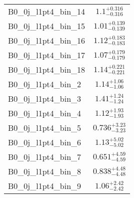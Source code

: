 \begin{tabular}{|l|c|}
B0\_0j\_l1pt4\_bin\_14 & $1.1^{+0.316}_{-0.316}$ \\
B0\_0j\_l1pt4\_bin\_15 & $1.01^{+0.139}_{-0.139}$ \\
B0\_0j\_l1pt4\_bin\_16 & $1.12^{+0.183}_{-0.183}$ \\
B0\_0j\_l1pt4\_bin\_17 & $1.07^{+0.179}_{-0.179}$ \\
B0\_0j\_l1pt4\_bin\_18 & $1.14^{+0.221}_{-0.221}$ \\
B0\_0j\_l1pt4\_bin\_2 & $1.14^{+1.06}_{-1.06}$ \\
B0\_0j\_l1pt4\_bin\_3 & $1.41^{+1.24}_{-1.24}$ \\
B0\_0j\_l1pt4\_bin\_4 & $1.12^{+1.93}_{-1.93}$ \\
B0\_0j\_l1pt4\_bin\_5 & $0.736^{+3.23}_{-3.23}$ \\
B0\_0j\_l1pt4\_bin\_6 & $1.13^{+5.02}_{-5.02}$ \\
B0\_0j\_l1pt4\_bin\_7 & $0.651^{+4.59}_{-4.59}$ \\
B0\_0j\_l1pt4\_bin\_8 & $0.838^{+4.48}_{-4.48}$ \\
B0\_0j\_l1pt4\_bin\_9 & $1.06^{+2.42}_{-2.42}$ \\
\hline
\end{tabular}
